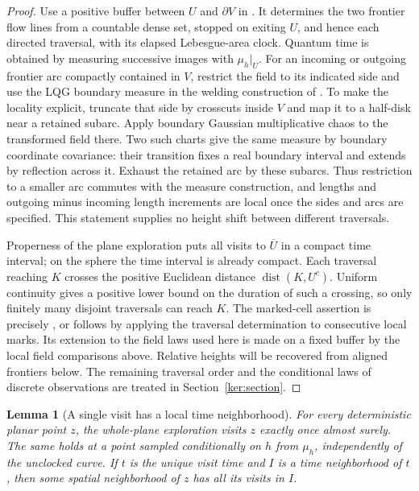 \documentclass[11pt]{article}
\numberwithin{equation}{section}
\newtheorem{lemma}[theorem]{Lemma}
\theoremstyle{definition}
\theoremstyle{remark}
\newcommand{\1}{\mathbf 1}
\DeclareMathOperator{\dist}{dist}
\begin{document}
\begin{proof}
Use a positive buffer between $U$ and $\partial V$ in
\cite[Lemma 2.4]{GwynneMillerSheffieldHarmonic}.  It determines the two
frontier flow lines from a countable dense set, stopped on exiting $U$,
and hence each directed traversal, with its elapsed Lebesgue-area clock.
Quantum time is obtained by measuring successive images with $\mu_h|_U$.
For an incoming or outgoing frontier arc compactly contained in $V$,
restrict the field to its indicated side and use the LQG boundary measure
in the welding construction of \cite{DMSMating}.  To make the locality
explicit, truncate that side by crosscuts inside $V$ and map it to a
half-disk near a retained subarc.  Apply boundary Gaussian multiplicative
chaos to the transformed field there.  Two such charts give the same
measure by boundary coordinate covariance: their transition fixes a
real boundary interval and extends by reflection across it.  Exhaust
the retained arc by these subarcs.  Thus restriction to a smaller arc
commutes with the measure construction, and lengths and outgoing minus
incoming length increments are local once the sides and arcs are
specified.  This statement supplies no height shift between different
traversals.

Properness of the plane exploration puts all visits to $\overline U$ in
a compact time interval; on the sphere the time interval is already
compact.  Each traversal reaching $K$ crosses the positive Euclidean
distance $\dist(K,U^c)$.  Uniform continuity gives a positive lower bound
on the duration of such a crossing, so only finitely many disjoint
traversals can reach $K$.  The marked-cell assertion is precisely
\cite[Lemma 3.7]{ContrerasHipGwynneCurvature}, or follows by applying the
traversal determination to consecutive local marks.  Its extension to
the field laws used here is made on a fixed buffer by the local field
comparisons above.  Relative heights will be recovered from aligned
frontiers below.  The remaining traversal order and the conditional
laws of discrete observations are treated in Section~\ref{ker:section}.
\end{proof}

\begin{lemma}[A single visit has a local time neighborhood]
\label{enc:single-visit}
For every deterministic planar point $z$, the whole-plane exploration
visits $z$ exactly once almost surely.  The same holds at a point sampled
conditionally on $h$ from $\mu_h$, independently of the unclocked curve.  If $t$ is the unique
visit time and $I$ is a time neighborhood of $t$, then some spatial
neighborhood of $z$ has all its visits in $I$.
\end{lemma}
\end{document}
